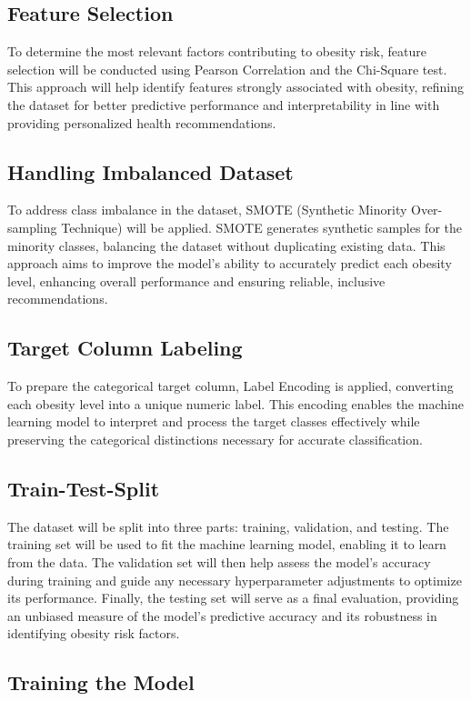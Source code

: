  \subsection{Feature Selection}
To determine the most relevant factors contributing to obesity risk, feature selection will be conducted using Pearson Correlation and the Chi-Square test. This approach will help identify features strongly associated with obesity, refining the dataset for better predictive performance and interpretability in line with providing personalized health recommendations. 

\subsection{ Handling Imbalanced Dataset}
To address class imbalance in the dataset, SMOTE (Synthetic Minority Over-sampling Technique) will be applied. SMOTE generates synthetic samples for the minority classes, balancing the dataset without duplicating existing data. This approach aims to improve the model's ability to accurately predict each obesity level, enhancing overall performance and ensuring reliable, inclusive recommendations. 

\subsection{Target Column Labeling}
To prepare the categorical target column, Label Encoding is applied, converting each obesity level into a unique numeric label. This encoding enables the machine learning model to interpret and process the target classes effectively while preserving the categorical distinctions necessary for accurate classification. 

\subsection{Train-Test-Split}
The dataset will be split into three parts: training, validation, and testing. The training set will be used to fit the machine learning model, enabling it to learn from the data. The validation set will then help assess the model's accuracy during training and guide any necessary hyperparameter adjustments to optimize its performance. Finally, the testing set will serve as a final evaluation, providing an unbiased measure of the model’s predictive accuracy and its robustness in identifying obesity risk factors. 
\subsection{Training the Model}

